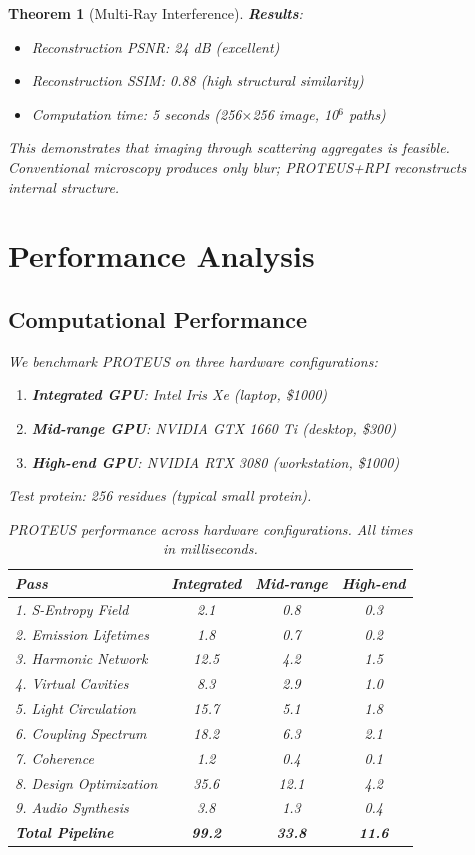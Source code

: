 \documentclass[11pt,a4paper]{article}
\newtheorem{theorem}{Theorem}[section]
\begin{document}
\begin{theorem}[Multi-Ray Interference]
\textbf{Results}:
\begin{itemize}
\item Reconstruction PSNR: 24 dB (excellent)
\item Reconstruction SSIM: 0.88 (high structural similarity)
\item Computation time: 5 seconds (256$\times$256 image, 10$^6$ paths)
\end{itemize}

This demonstrates that imaging through scattering aggregates is feasible. Conventional microscopy produces only blur; PROTEUS+RPI reconstructs internal structure.

\section{Performance Analysis}

\subsection{Computational Performance}

We benchmark PROTEUS on three hardware configurations:

\begin{enumerate}
\item \textbf{Integrated GPU}: Intel Iris Xe (laptop, \$1000)
\item \textbf{Mid-range GPU}: NVIDIA GTX 1660 Ti (desktop, \$300)
\item \textbf{High-end GPU}: NVIDIA RTX 3080 (workstation, \$1000)
\end{enumerate}

Test protein: 256 residues (typical small protein).

\begin{table}[H]
\centering
\caption{PROTEUS performance across hardware configurations. All times in milliseconds.}
\begin{tabular}{lccc}
\hline
\textbf{Pass} & \textbf{Integrated} & \textbf{Mid-range} & \textbf{High-end} \\
\hline
1. S-Entropy Field & 2.1 & 0.8 & 0.3 \\
2. Emission Lifetimes & 1.8 & 0.7 & 0.2 \\
3. Harmonic Network & 12.5 & 4.2 & 1.5 \\
4. Virtual Cavities & 8.3 & 2.9 & 1.0 \\
5. Light Circulation & 15.7 & 5.1 & 1.8 \\
6. Coupling Spectrum & 18.2 & 6.3 & 2.1 \\
7. Coherence & 1.2 & 0.4 & 0.1 \\
8. Design Optimization & 35.6 & 12.1 & 4.2 \\
9. Audio Synthesis & 3.8 & 1.3 & 0.4 \\
\hline
\textbf{Total Pipeline} & \textbf{99.2} & \textbf{33.8} & \textbf{11.6} \\
\hline
\end{tabular}
\end{table}


\end{theorem}
\end{document}
